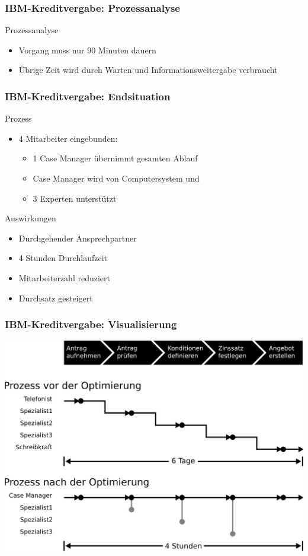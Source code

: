 \documentclass{beamer}
\begin{document}
 \begin{frame}
  \frametitle{IBM-Kreditvergabe: Prozessanalyse}
  Prozessanalyse
  \begin{itemize}
    \item Vorgang muss nur 90 Minuten dauern
    \item Übrige Zeit wird durch Warten und Informationsweitergabe verbraucht
  \end{itemize}
 \end{frame}

 \begin{frame}
  \frametitle{IBM-Kreditvergabe: Endsituation}
  Prozess
  \begin{itemize}
    \item 4 Mitarbeiter eingebunden:
    \begin{itemize}
      \item 1 Case Manager übernimmt gesamten Ablauf
      \item Case Manager wird von Computersystem und
      \item 3 Experten unterstützt
    \end{itemize}
  \end{itemize}

  Auswirkungen
  \begin{itemize}
    \item Durchgehender Ansprechpartner
    \item 4 Stunden Durchlaufzeit
    \item Mitarbeiterzahl reduziert
    \item Durchsatz gesteigert
  \end{itemize}
 \end{frame}

 \begin{frame}
  \frametitle{IBM-Kreditvergabe: Visualisierung}
  \includegraphics[scale=2.5]{4_5.png}
 \end{frame}
\end{document}
